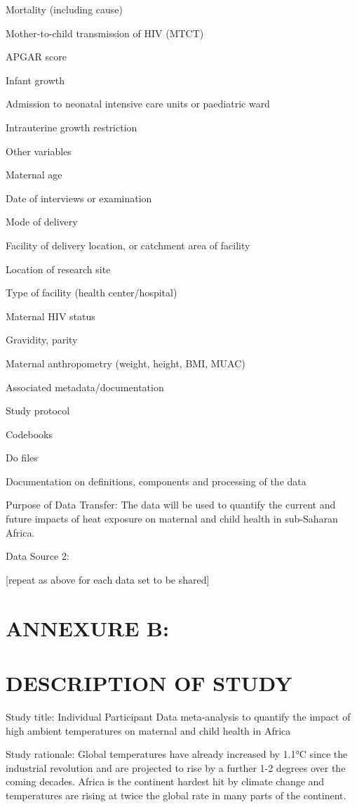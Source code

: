 \documentclass[12pt,letterpaper]{article}
\begin{document}
Mortality (including cause)

Mother-to-child transmission of HIV (MTCT)

APGAR score

Infant growth

Admission to neonatal intensive care units or paediatric ward

Intrauterine growth restriction

Other variables

Maternal age

Date of interviews or examination

Mode of delivery

Facility of delivery location, or catchment area of facility

Location of research site

Type of facility (health center/hospital)

Maternal HIV status

Gravidity, parity

Maternal anthropometry (weight, height, BMI, MUAC)

Associated metadata/documentation

Study protocol

Codebooks

Do files

Documentation on definitions, components and processing of the data

Purpose of Data Transfer: The data will be used to quantify the current and future impacts of heat exposure on maternal and child health in sub-Saharan Africa.

Data Source 2:

[repeat as above for each data set to be shared]

\section*{ANNEXURE B:}

\section*{DESCRIPTION OF STUDY}

Study title: Individual Participant Data meta-analysis to quantify the impact of high ambient temperatures on maternal and child health in Africa

Study rationale: Global temperatures have already increased by 1.1°C since the industrial revolution and are projected to rise by a further 1-2 degrees over the coming decades. Africa is the continent hardest hit by climate change and temperatures are rising at twice the global rate in many parts of the continent.
\end{document}
